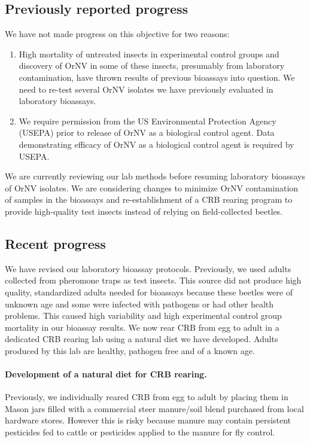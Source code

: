 \documentclass[12pt,letterpaper,english,bibliography=totocnumbered, abstract=on]{scrartcl}
\begin{document}
\subsection{Previously reported progress}

We have not made progress on this objective for two reasons:
\begin{enumerate}
	\item High mortality of untreated insects in experimental control groups and discovery of OrNV in some of these insects, presumably from laboratory contamination, have thrown results of previous bioassays into question.  We need to re-test several OrNV isolates we have previously evaluated in laboratory bioassays.
	\item We require permission from the US Environmental Protection Agency (USEPA) prior to release of OrNV as a biological control agent. Data demonstrating efficacy of OrNV as a biological control agent is required by USEPA.  
\end{enumerate}

We are currently reviewing our lab methods before resuming laboratory bioassays of OrNV isolates. We are considering changes to minimize OrNV contamination of samples in the bioassays and re-establishment of a CRB rearing program to provide high-quality test insects instead of relying on field-collected beetles.

\subsection{Recent progress}

We have revised our laboratory bioassay protocols. Previously, we used adults collected from pheromone traps as test insects. This source did not produce high quality, standardized adults needed for bioassays because these beetles were of unknown age and some were infected with pathogens or had other health problems. This caused high variability and high experimental control group mortality in our bioassay results. We now rear CRB from egg to adult in a dedicated CRB rearing lab using a natural diet we have developed. Adults produced by this lab are healthy, pathogen free and of a known age.

\paragraph{Development of a natural diet for CRB rearing.}

Previously, we individually reared CRB from egg to adult by placing them in Mason jars filled with a commercial steer manure/soil blend purchased from local hardware stores. However this is risky because manure may contain persistent pesticides fed to cattle or pesticides applied to the manure for fly control. 
\end{document}
